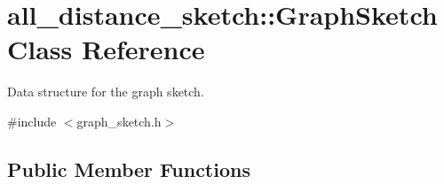 \hypertarget{classall__distance__sketch_1_1GraphSketch}{}\section{all\+\_\+distance\+\_\+sketch\+:\+:Graph\+Sketch Class Reference}
\label{classall__distance__sketch_1_1GraphSketch}


Data structure for the graph sketch.  




{\ttfamily \#include $<$graph\+\_\+sketch.\+h$>$}

\subsection*{Public Member Functions}
